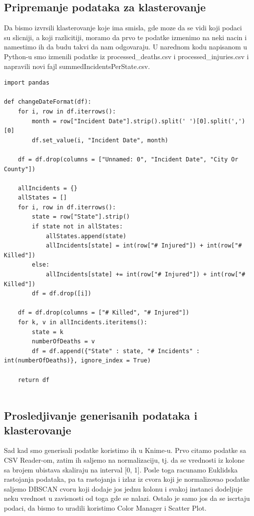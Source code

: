 \documentclass[11pt]{article} %
\begin{document}
	\subsection{Pripremanje podataka za klasterovanje}
	Da bismo izvrsili klasterovanje koje ima smisla, gde moze da se vidi koji podaci su slicniji, a koji razlicitiji, moramo da prvo te podatke izmenimo na 
	neki nacin i namestimo ih da budu takvi da nam odgovaraju. U narednom kodu napisanom u Python-u smo izmenili podatke iz 
	processed\_deaths.csv i processed\_injuries.csv i napravili novi fajl summedIncidentsPerState.csv.
	\newline
	
	\begin{lstlisting}
import pandas

def changeDateFormat(df):
	for i, row in df.iterrows():
		month = row["Incident Date"].strip().split(' ')[0].split(',')[0]
		df.set_value(i, "Incident Date", month)
	
	df = df.drop(columns = ["Unnamed: 0", "Incident Date", "City Or County"])
	
	allIncidents = {}
	allStates = []
	for i, row in df.iterrows():
		state = row["State"].strip()
		if state not in allStates:
			allStates.append(state)
			allIncidents[state] = int(row["# Injured"]) + int(row["# Killed"])
		else:
			allIncidents[state] += int(row["# Injured"]) + int(row["# Killed"])
		df = df.drop([i])
	
	df = df.drop(columns = ["# Killed", "# Injured"])
	for k, v in allIncidents.iteritems():
		state = k
		numberOfDeaths = v
		df = df.append({"State" : state, "# Incidents" : int(numberOfDeaths)}, ignore_index = True)
	
	return df
	
    \end{lstlisting}
	
	\subsection{Prosledjivanje generisanih podataka i klasterovanje}
	Sad kad smo generisali podatke koristimo ih u Knime-u.
	Prvo citamo podatke sa CSV Reader-om, zatim ih saljemo na normalizaciju, tj. da se vrednosti iz kolone sa brojem ubistava skaliraju na interval [0, 1].
	Posle toga racunamo Euklidska rastojanja podataka, pa ta rastojanja i izlaz iz cvora koji je normalizovao podatke saljemo DBSCAN cvoru koji 
	dodaje jos jednu kolonu i svakoj instanci dodeljuje neku vrednost u zavisnosti od toga gde se nalazi.
	Ostalo je samo jos da se iscrtaju podaci, da bismo to uradili koristimo Color Manager i Scatter Plot.
	\newline
	
\end{document}
